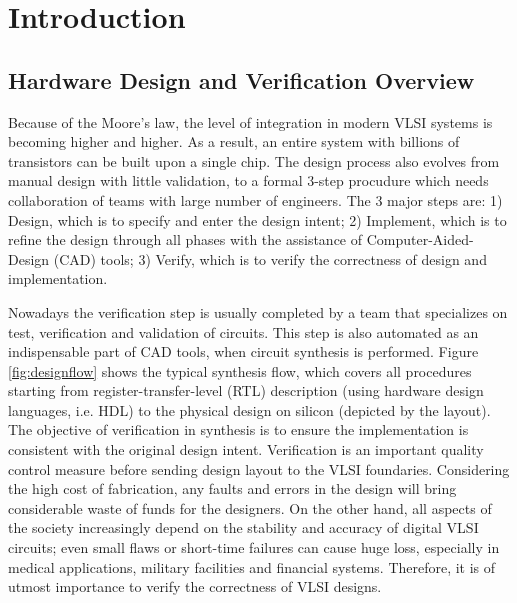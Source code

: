 \chapter{Introduction}
\label{ch:intro}





\section{Hardware Design and Verification Overview}
Because of the Moore's law, the level of integration in modern VLSI systems is becoming higher and higher. 
As a result, an entire system with billions of transistors can be built upon a single chip.
The design process also evolves from manual design with little validation, to 
a formal 3-step procudure which needs collaboration of teams with large number of 
engineers. The 3 major steps are: 1) Design, which is to specify and enter the design intent;
2) Implement, which is to refine the design through all phases with the assistance of Computer-Aided-Design (CAD)
tools; 3) Verify, which is to verify the correctness of design and implementation.

Nowadays the verification step is usually completed by a team that specializes on test, verification and validation of 
circuits. This step is also automated as an indispensable part of CAD tools, when circuit synthesis is performed. 
Figure \ref{fig:designflow} shows the typical synthesis flow, which covers all procedures starting from 
register-transfer-level (RTL) description (using hardware design languages, i.e. HDL) to  the 
physical design on silicon (depicted by the layout). The objective of verification in synthesis is 
to ensure the implementation is consistent with the original design intent. Verification is 
an important quality control measure before sending design layout to the VLSI foundaries.
Considering the high cost of fabrication, any faults and errors in the design will bring considerable 
waste of funds for the designers. On the other hand, all aspects of the society increasingly depend on 
the stability and accuracy of digital VLSI circuits; even small flaws or short-time failures can cause 
huge loss, especially in medical applications, military facilities and financial systems.
Therefore, it is of utmost importance to verify the correctness of VLSI designs.

